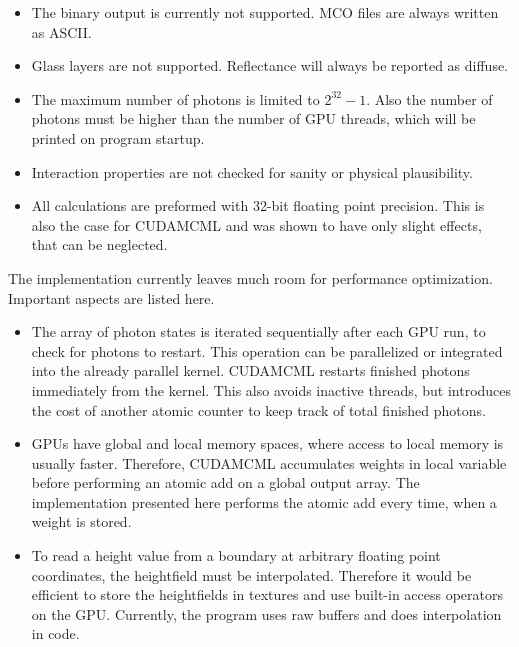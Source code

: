 \documentclass[]{article}
\begin{document}
\begin{itemize}
\item The binary output is currently not supported. MCO files are always written as ASCII.

\item Glass layers are not supported. Reflectance will always be reported as diffuse.

\item The maximum number of photons is limited to $2^{32}-1$. Also the number of photons must be higher than the number of GPU threads, which will be printed on program startup.

\item Interaction properties are not checked for sanity or physical plausibility.

\item All calculations are preformed with 32-bit floating point precision. This is also the case for CUDAMCML and was shown to have only slight effects, that can be neglected.
\end{itemize}

The implementation currently leaves much room for performance optimization. Important aspects are listed here.

\begin{itemize}
\item The array of photon states is iterated sequentially after each GPU run, to check for photons to restart. This operation can be parallelized or integrated into the already parallel kernel. CUDAMCML restarts finished photons immediately from the kernel. This also avoids inactive threads, but introduces the cost of another atomic counter to keep track of total finished photons.
	
\item GPUs have global and local memory spaces, where access to local memory is usually faster. Therefore, CUDAMCML accumulates weights in local variable before performing an atomic add on a global output array. The implementation presented here performs the atomic add every time, when a weight is stored.
	
\item To read a height value from a boundary at arbitrary floating point coordinates, the heightfield must be interpolated. Therefore it would be efficient to store the heightfields in textures and use built-in access operators on the GPU. Currently, the program uses raw buffers and does interpolation in code.
\end{itemize}
\end{document}
